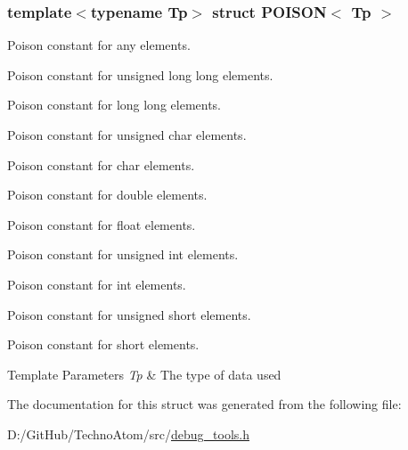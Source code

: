 \subsubsection*{template$<$typename Tp$>$\newline
struct P\+O\+I\+S\+O\+N$<$ Tp $>$}

Poison constant for any elements. 

Poison constant for unsigned long long elements.

Poison constant for long long elements.

Poison constant for unsigned char elements.

Poison constant for char elements.

Poison constant for double elements.

Poison constant for float elements.

Poison constant for unsigned int elements.

Poison constant for int elements.

Poison constant for unsigned short elements.

Poison constant for short elements.


\begin{DoxyTemplParams}{Template Parameters}
{\em Tp} & The type of data used \\
\hline
\end{DoxyTemplParams}


The documentation for this struct was generated from the following file\+:\begin{DoxyCompactItemize}
\item 
D\+:/\+Git\+Hub/\+Techno\+Atom/src/\hyperlink{debug__tools_8h}{debug\+\_\+tools.\+h}\end{DoxyCompactItemize}
